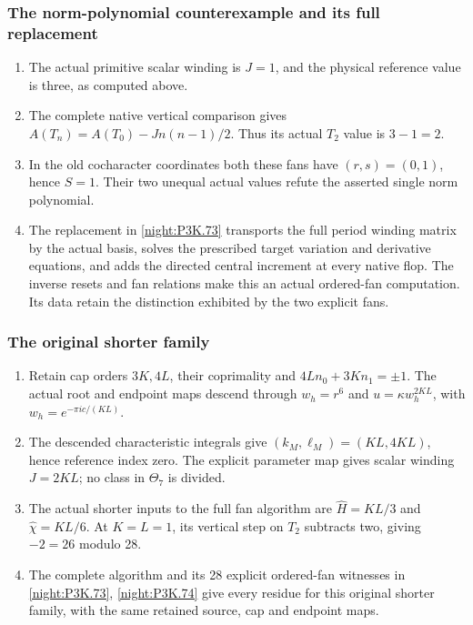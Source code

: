 \subsubsection{The norm-polynomial counterexample and its full replacement}
\RungOne
\begin{enumerate}[label=\arabic*.]
\item The actual primitive scalar winding is $J=1$, and the
  physical reference value is three, as computed above.
\item The complete native vertical comparison gives
  $A(T_n)=A(T_0)-J n(n-1)/2$. Thus its actual $T_2$ value
  is $3-1=2$.
\item In the old cocharacter coordinates both these fans
  have $(r,s)=(0,1)$, hence $S=1$. Their two unequal
  actual values refute the asserted single norm polynomial.
\item The replacement in \cref{night:P3K.73} transports the
  full period winding matrix by the actual basis, solves
  the prescribed target variation and derivative equations,
  and adds the directed central increment at every native
  flop. The inverse resets and fan relations make this
  an actual ordered-fan computation. Its data retain the
  distinction exhibited by the two explicit fans.
\end{enumerate}

\subsubsection{The original shorter family}
\RungOne
\begin{enumerate}[label=\arabic*.]
\item Retain cap orders $3K,4L$, their coprimality and
  $4Ln_0+3Kn_1=\pm1$. The actual root and endpoint maps
  descend through $w_h=r^6$ and
  $u=\kappa w_h^{2KL}$, with
  $w_h=e^{-\pi i c/(KL)}$.
\item The descended characteristic integrals give
  $(k_M,\ell_M)=(KL,4KL)$, hence reference index zero.
  The explicit parameter map gives scalar winding $J=2KL$;
  no class in $\Theta_7$ is divided.
\item The actual shorter inputs to the full fan algorithm
  are $\widehat H=KL/3$ and $\widehat\chi=KL/6$.
  At $K=L=1$, its vertical step on $T_2$ subtracts two,
  giving $-2=26$ modulo 28.
\item The complete algorithm and its 28 explicit ordered-fan
  witnesses in \cref{night:P3K.73}, \cref{night:P3K.74} give every
  residue for this original shorter family, with the same
  retained source, cap and endpoint maps.
\end{enumerate}

